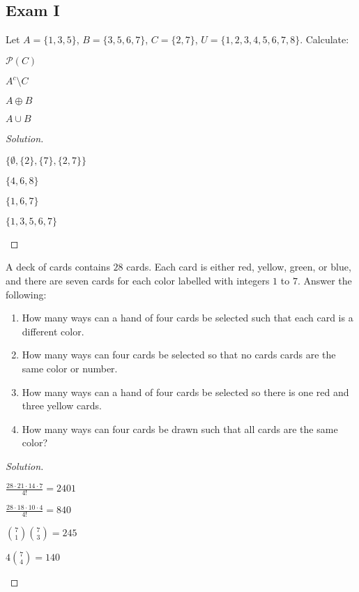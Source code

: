 \documentclass[crop=false,class=book]{standalone}
\begin{document}
\subsection{Exam I}
\begin{problem}
Let $A = \{1,3,5\}$, $B = \{3,5,6,7\}$, $C = \{2,7\}$, $U = \{1,2,3,4,5,6,7,8\}$. Calculate:
\begin{enumerate}
\begin{multicols}{4}
    \item $\mathcal{P}(C)$
    \item $A^c \setminus C$
    \item $A\oplus B$
    \item $A\cup B$
\end{multicols}
\end{enumerate}
\end{problem}
\begin{proof}[Solution]
\vspace{-\topsep}
\
\begin{enumerate}
\begin{multicols}{4}
    \item $\big\{\emptyset, \{2\}, \{7\}, \{2,7\}\big\}$
    \item $\{4,6,8\}$
    \item $\{1,6,7\}$
    \item $\{1,3,5,6,7\}$
\end{multicols}
\end{enumerate}
\end{proof}
\begin{problem}
A deck of cards contains $28$ cards. Each card is either red, yellow, green, or blue, and there are seven cards for each color labelled with integers $1$ to $7$. Answer the following:
\begin{enumerate}
    \item How many ways can a hand of four cards be selected such that each card is a different color.
    \item How many ways can four cards be selected so that no cards cards are the same color or number.
    \item How many ways can a hand of four cards be selected so there is one red and three yellow cards. 
    \item How many ways can four cards be drawn such that all cards are the same color?
\end{enumerate}
\end{problem}
\begin{proof}[Solution]
\vspace{-\topsep}
\
\begin{enumerate}
\end{enumerate}
\end{proof}
\end{document}
